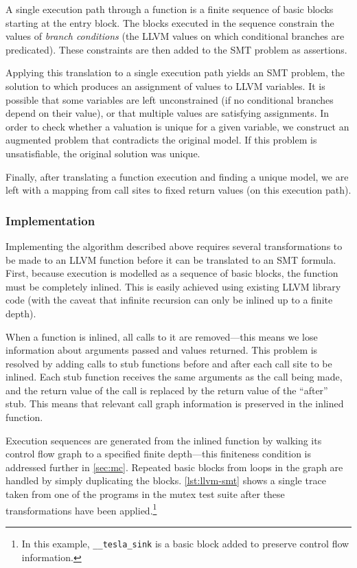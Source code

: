 A single execution path through a function is a finite sequence of basic blocks
starting at the entry block. The blocks executed in the sequence constrain the
values of \emph{branch conditions} (the LLVM values on which conditional
branches are predicated). These constraints are then added to the SMT problem as
assertions.

Applying this translation to a single execution path yields an SMT problem, the
solution to which produces an assignment of values to LLVM variables. It is
possible that some variables are left unconstrained (if no conditional branches
depend on their value), or that multiple values are satisfying assignments. In
order to check whether a valuation is unique for a given variable, we construct
an augmented problem that contradicts the original model. If this problem is
unsatisfiable, the original solution was unique.

Finally, after translating a function execution and finding a unique model, we
are left with a mapping from call sites to fixed return values (on this
execution path).

\subsubsection{Implementation}

Implementing the algorithm described above requires several transformations to
be made to an LLVM function before it can be translated to an SMT
formula. First, because execution is modelled as a sequence of basic
blocks, the function must be completely inlined. This is easily achieved using
existing LLVM library code (with the caveat that infinite recursion can only be
inlined up to a finite depth).

When a function is inlined, all calls to it are removed---this means we lose
information about arguments passed and values returned. This problem is resolved
by adding calls to stub functions before and after each call site to be inlined.
Each stub function receives the same arguments as the call being made, and the
return value of the call is replaced by the return value of the ``after'' stub.
This means that relevant call graph information is preserved in the inlined
function.

Execution sequences are generated from the inlined function by walking its
control flow graph to a specified finite depth---this finiteness condition is
addressed further in \autoref{sec:mc}. Repeated basic blocks from loops in the
graph are handled by simply duplicating the blocks. \autoref{lst:llvm-smt} shows
a single trace taken from one of the programs in the mutex test suite after
these transformations have been applied.\footnote{In this example,
\texttt{\_\_tesla\_sink} is a basic block added to preserve control flow
information.}

